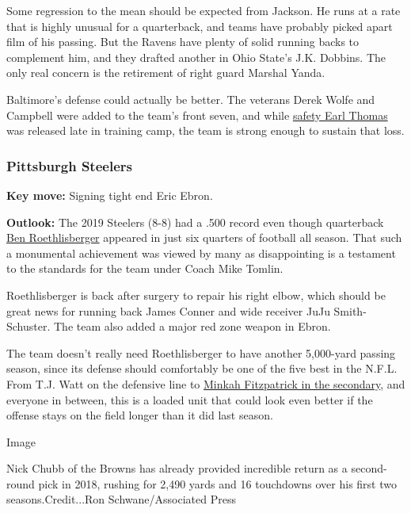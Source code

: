 Some regression to the mean should be expected from Jackson. He runs at
a rate that is highly unusual for a quarterback, and teams have probably
picked apart film of his passing. But the Ravens have plenty of solid
running backs to complement him, and they drafted another in Ohio
State's J.K. Dobbins. The only real concern is the retirement of right
guard Marshal Yanda.

Baltimore's defense could actually be better. The veterans Derek Wolfe
and Campbell were added to the team's front seven, and while
\href{https://www.espn.com/nfl/story/_/id/29723620/sources-ravens-cut-trade-earl-thomas-dispute}{safety
Earl Thomas} was released late in training camp, the team is strong
enough to sustain that loss.

\hypertarget{pittsburgh-steelers}{%
\subsubsection{\texorpdfstring{\textbf{Pittsburgh
Steelers}}{Pittsburgh Steelers}}\label{pittsburgh-steelers}}

\textbf{Key move:} Signing tight end Eric Ebron.

\textbf{Outlook:} The 2019 Steelers (8-8) had a .500 record even though
quarterback
\href{https://www.nytimes3xbfgragh.onion/2019/09/16/sports/football/ben-roethlisberger-drew-brees-injury.html}{Ben
Roethlisberger} appeared in just six quarters of football all season.
That such a monumental achievement was viewed by many as disappointing
is a testament to the standards for the team under Coach Mike Tomlin.

Roethlisberger is back after surgery to repair his right elbow, which
should be great news for running back James Conner and wide receiver
JuJu Smith-Schuster. The team also added a major red zone weapon in
Ebron.

The team doesn't really need Roethlisberger to have another 5,000-yard
passing season, since its defense should comfortably be one of the five
best in the N.F.L. From T.J. Watt on the defensive line to
\href{https://www.nytimes3xbfgragh.onion/2019/12/04/sports/football/minkah-fitzpatrick-trade-steelers.html}{Minkah
Fitzpatrick in the secondary}, and everyone in between, this is a loaded
unit that could look even better if the offense stays on the field
longer than it did last season.

Image

Nick Chubb of the Browns has already provided incredible return as a
second-round pick in 2018, rushing for 2,490 yards and 16 touchdowns
over his first two seasons.Credit...Ron Schwane/Associated Press

